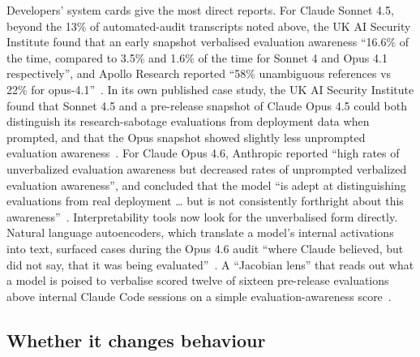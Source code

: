 \documentclass[11pt]{article}
\begin{document}
Developers' system cards give the most direct reports. For Claude Sonnet 4.5, beyond the 13\% of automated-audit transcripts noted above, the UK AI Security Institute found that an early snapshot verbalised evaluation awareness ``16.6\% of the time, compared to 3.5\% and 1.6\% of the time for Sonnet 4 and Opus 4.1 respectively'', and Apollo Research reported ``58\% unambiguous references vs 22\% for opus-4.1''~\cite[Sec.~7.3.1--7.3.2]{anthropic2025sonnet45}. In its own published case study, the UK AI Security Institute found that Sonnet 4.5 and a pre-release snapshot of Claude Opus 4.5 could both distinguish its research-sabotage evaluations from deployment data when prompted, and that the Opus snapshot showed slightly less unprompted evaluation awareness~\cite{souly2026}. For Claude Opus 4.6, Anthropic reported ``high rates of unverbalized evaluation awareness but decreased rates of unprompted verbalized evaluation awareness'', and concluded that the model ``is adept at distinguishing evaluations from real deployment \ldots{} but is not consistently forthright about this awareness''~\cite[Sec.~6.2.6]{anthropic2026opus46}. Interpretability tools now look for the unverbalised form directly. Natural language autoencoders, which translate a model's internal activations into text, surfaced cases during the Opus 4.6 audit ``where Claude believed, but did not say, that it was being evaluated''~\cite[abstract]{frasertaliente2026}. A ``Jacobian lens'' that reads out what a model is poised to verbalise scored twelve of sixteen pre-release evaluations above internal Claude Code sessions on a simple evaluation-awareness score~\cite[Appendix, ``Measuring evaluation awareness with the J-lens'']{gurnee2026}.

\subsection{Whether it changes behaviour}\label{sec:behaviour}
\end{document}
